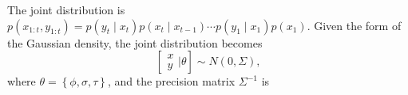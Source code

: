 The joint distribution is $p(x_{1:t},y_{1:t}) = p(y_t\mid x_t)p(x_t\mid x_{t-1})\cdots p(y_1\mid x_1)p(x_1)$. Given the form of the Gaussian density, the joint distribution becomes 
\begin{equation}
\left[ \begin{matrix} x\\y  \end{matrix}\bigg\rvert \theta \right]
\sim N\left(0, \Sigma  \right),
\end{equation}
where $\theta = \left\lbrace \phi,\sigma,\tau\right\rbrace$, and the precision matrix $\Sigma^{-1}$ is  
